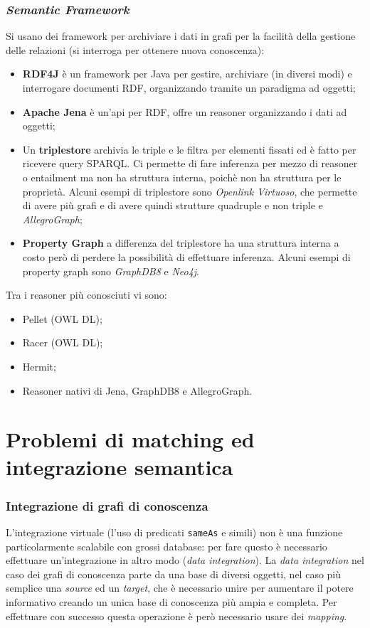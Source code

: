 \documentclass[11pt]{article}
\begin{document}
\section{\textit{Semantic Framework}}
Si usano dei framework per archiviare i dati in grafi per la facilità della gestione delle relazioni (si interroga per ottenere nuova conoscenza):
\begin{itemize}
\item \textbf{RDF4J} è un framework per Java per gestire, archiviare (in diversi modi) e interrogare documenti RDF, organizzando tramite un paradigma ad oggetti;
\item \textbf{Apache Jena} è un'api per RDF, offre un reasoner organizzando i dati ad oggetti;
\item Un \textbf{triplestore} archivia le triple e le filtra per elementi fissati ed è fatto per ricevere query SPARQL. Ci permette di fare inferenza per mezzo di reasoner o entailment ma non ha struttura interna, poichè non ha struttura per le proprietà. Alcuni esempi di triplestore sono \textit{Openlink Virtuoso}, che permette di avere più grafi e di avere quindi strutture quadruple e non triple e \textit{AllegroGraph};
\item \textbf{Property Graph} a differenza del triplestore ha una struttura interna a costo però di perdere la possibilità di effettuare inferenza. Alcuni esempi di property graph sono \textit{GraphDB8} e \textit{Neo4j}.
\end{itemize}
Tra i reasoner più conosciuti vi sono:
\begin{itemize}
\item Pellet (OWL DL);
\item Racer (OWL DL);
\item Hermit;
\item Reasoner nativi di Jena, GraphDB8 e AllegroGraph.
\end{itemize}

\newpage
\part{Problemi di matching ed integrazione semantica}
\section{Integrazione di grafi di conoscenza}
L'integrazione virtuale (l'uso di predicati \verb|sameAs| e simili) non è una funzione particolarmente scalabile con grossi database: per fare questo è necessario effettuare un'integrazione in altro modo (\textit{data integration}).
La \textit{data integration} nel caso dei grafi di conoscenza parte da una base di diversi oggetti, nel caso più semplice una \textit{source} ed un \textit{target}, che è necessario unire per aumentare il potere informativo creando un unica base di conoscenza più ampia e completa. Per effettuare con successo questa operazione è però necessario usare dei \textit{mapping}.
\end{document}
